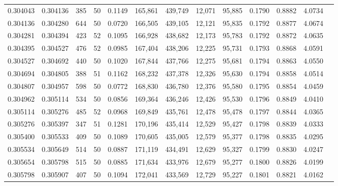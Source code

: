 \begin{tabular}{rrrrrrrrrrrrr}
0.304043 & 0.304136 &   385 &  50 &                                     0.1149 & 165,861 & 439,749 &  12,071 &  95,885 & 0.1790 & 0.8882 & 4.0734 \\
0.304136 & 0.304280 &   644 &  50 &                                     0.0720 & 166,505 & 439,105 &  12,121 &  95,835 & 0.1792 & 0.8877 & 4.0674 \\
0.304281 & 0.304394 &   423 &  52 &                                     0.1095 & 166,928 & 438,682 &  12,173 &  95,783 & 0.1792 & 0.8872 & 4.0635 \\
0.304395 & 0.304527 &   476 &  52 &                                     0.0985 & 167,404 & 438,206 &  12,225 &  95,731 & 0.1793 & 0.8868 & 4.0591 \\
0.304527 & 0.304692 &   440 &  50 &                                     0.1020 & 167,844 & 437,766 &  12,275 &  95,681 & 0.1794 & 0.8863 & 4.0550 \\
0.304694 & 0.304805 &   388 &  51 &                                     0.1162 & 168,232 & 437,378 &  12,326 &  95,630 & 0.1794 & 0.8858 & 4.0514 \\
0.304807 & 0.304957 &   598 &  50 &                                     0.0772 & 168,830 & 436,780 &  12,376 &  95,580 & 0.1795 & 0.8854 & 4.0459 \\
0.304962 & 0.305114 &   534 &  50 &                                     0.0856 & 169,364 & 436,246 &  12,426 &  95,530 & 0.1796 & 0.8849 & 4.0410 \\
0.305114 & 0.305276 &   485 &  52 &                                     0.0968 & 169,849 & 435,761 &  12,478 &  95,478 & 0.1797 & 0.8844 & 4.0365 \\
0.305276 & 0.305397 &   347 &  51 &                                     0.1281 & 170,196 & 435,414 &  12,529 &  95,427 & 0.1798 & 0.8839 & 4.0333 \\
0.305400 & 0.305533 &   409 &  50 &                                     0.1089 & 170,605 & 435,005 &  12,579 &  95,377 & 0.1798 & 0.8835 & 4.0295 \\
0.305534 & 0.305649 &   514 &  50 &                                     0.0887 & 171,119 & 434,491 &  12,629 &  95,327 & 0.1799 & 0.8830 & 4.0247 \\
0.305654 & 0.305798 &   515 &  50 &                                     0.0885 & 171,634 & 433,976 &  12,679 &  95,277 & 0.1800 & 0.8826 & 4.0199 \\
0.305798 & 0.305907 &   407 &  50 &                                     0.1094 & 172,041 & 433,569 &  12,729 &  95,227 & 0.1801 & 0.8821 & 4.0162 \\

\end{tabular}
